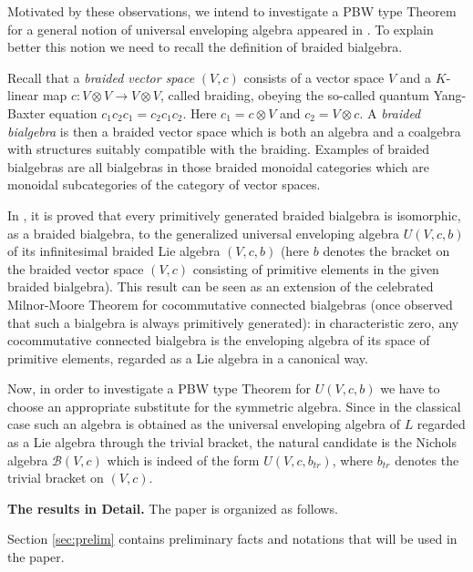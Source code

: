 \documentclass[english]{amsart}
\numberwithin{equation}{section}
\numberwithin{figure}{section}
\theoremstyle{plain}
\theoremstyle{definition}
\theoremstyle{definition}
\theoremstyle{remark}
\theoremstyle{remark}
\theoremstyle{plain}
\theoremstyle{plain}
\theoremstyle{plain}
\begin{document}
Motivated by these observations, we intend to investigate a PBW type
Theorem for a general notion of universal enveloping algebra appeared
in \cite[Definition 5.2]{Ardizzoni-MMPrim}. To explain better this
notion we need to recall the definition of braided bialgebra.

Recall that a \emph{braided vector space} $(V,c)$ consists of a vector
space $V$ and a $K$-linear map $c:V\otimes V\rightarrow V\otimes V$,
called braiding, obeying the so-called quantum Yang-Baxter equation
$c_{1}c_{2}c_{1}=c_{2}c_{1}c_{2}$. Here $c_{1}=c\otimes V$ and $c_{2}=V\otimes c.$
A \emph{braided bialgebra} is then a braided vector space which is
both an algebra and a coalgebra with structures suitably compatible
with the braiding. Examples of braided bialgebras are all bialgebras
in those braided monoidal categories which are monoidal subcategories
of the category of vector spaces.

In \cite[Theorem 6.9]{Ardizzoni-MMPrim}, it is proved that every
primitively generated braided bialgebra is isomorphic, as a braided
bialgebra, to the generalized universal enveloping algebra $U(V,c,b)$
of its infinitesimal braided Lie algebra $(V,c,b)$ (here $b$ denotes
the bracket on the braided vector space $(V,c)$ consisting of primitive
elements in the given braided bialgebra). This result can be seen
as an extension of the celebrated Milnor-Moore Theorem \cite[Theorem 5.18]{Milnor-Moore}
for cocommutative connected bialgebras (once observed that such a
bialgebra is always primitively generated): in characteristic zero,
any cocommutative connected bialgebra is the enveloping algebra of
its space of primitive elements, regarded as a Lie algebra in a canonical
way. 

Now, in order to investigate a PBW type Theorem for $U(V,c,b)$ we
have to choose an appropriate substitute for the symmetric algebra.
Since in the classical case such an algebra is obtained as the universal
enveloping algebra of $L$ regarded as a Lie algebra through the trivial
bracket, the natural candidate is the Nichols algebra $\mathcal{B}\left(V,c\right)$
which is indeed of the form $U(V,c,b_{tr})$, where $b_{tr}$ denotes
the trivial bracket on $(V,c)$.\medskip{}


\textbf{The results in Detail.} The paper is organized as follows.

Section \ref{sec:prelim} contains preliminary facts and notations
that will be used in the paper.
\end{document}
